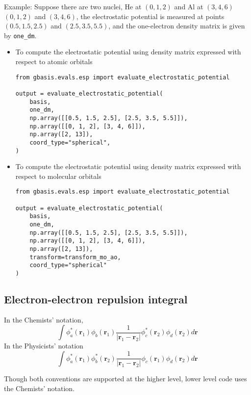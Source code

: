 \documentclass[letterpaper]{article}
\begin{document}
Example:
Suppose there are two nuclei, He at $(0, 1, 2)$ and Al at $(3, 4, 6)$
$(0, 1, 2)$ and $(3, 4, 6)$, the electrostatic potential is measured at
points $(0.5, 1.5, 2.5)$ and $(2.5, 3.5, 5.5)$, and the one-electron density
matrix is given by \verb|one_dm|.
\begin{itemize}
\item To compute the electrostatic potential using density matrix expressed with
  respect to atomic orbitals
  \begin{lstlisting}[xleftmargin=-25pt]
from gbasis.evals.esp import evaluate_electrostatic_potential

output = evaluate_electrostatic_potential(
    basis,
    one_dm,
    np.array([[0.5, 1.5, 2.5], [2.5, 3.5, 5.5]]),
    np.array([[0, 1, 2], [3, 4, 6]]),
    np.array([2, 13]),
    coord_type="spherical",
)
\end{lstlisting}
\item To compute the electrostatic potential using density matrix expressed with
  respect to molecular orbitals
  \begin{lstlisting}[xleftmargin=-25pt]
from gbasis.evals.esp import evaluate_electrostatic_potential

output = evaluate_electrostatic_potential(
    basis,
    one_dm,
    np.array([[0.5, 1.5, 2.5], [2.5, 3.5, 5.5]]),
    np.array([[0, 1, 2], [3, 4, 6]]),
    np.array([2, 13]),
    transform=transform_mo_ao,
    coord_type="spherical"
)
\end{lstlisting}
\end{itemize}
\subsection{Electron-electron repulsion integral}
In the Chemists' notation,
\begin{equation}
  \label{eq:elec_repulsion}
  \int \phi^*_a(\mathbf{r}_1) \phi_b(\mathbf{r}_1)
  \frac{1}{|\mathbf{r}_1 - \mathbf{r}_2|}
  \phi^*_c(\mathbf{r}_2) \phi_d(\mathbf{r}_2) d\mathbf{r}
\end{equation}
In the Physicists' notation
\begin{equation}
  \label{eq:elec_repulsion_phys}
  \int \phi^*_a(\mathbf{r}_1) \phi^*_b(\mathbf{r}_2)
  \frac{1}{|\mathbf{r}_1 - \mathbf{r}_2|}
  \phi_c(\mathbf{r}_1) \phi_d(\mathbf{r}_2) d\mathbf{r}
\end{equation}

Though both conventions are supported at the higher level, lower level code uses
the Chemists' notation.
\end{document}
